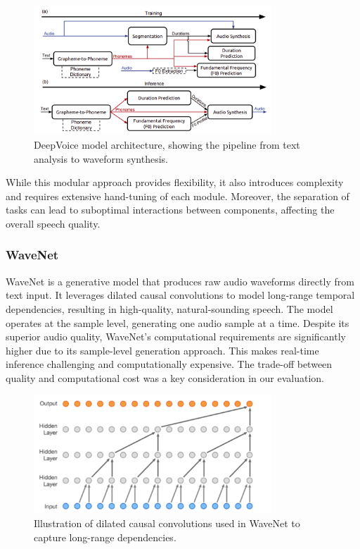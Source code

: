 \begin{figure}[h]
\centering
\includegraphics[width=0.8\textwidth]{deepvoice.png}
\caption{DeepVoice model architecture, showing the pipeline from text analysis to waveform synthesis.}
\label{fig:deepvoice_model}
\end{figure}

While this modular approach provides flexibility, it also introduces complexity and requires extensive hand-tuning of each module. Moreover, the separation of tasks can lead to suboptimal interactions between components, affecting the overall speech quality.



\subsubsection{WaveNet}

WaveNet is a generative model that produces raw audio waveforms directly from text input. It leverages dilated causal convolutions to model long-range temporal dependencies, resulting in high-quality, natural-sounding speech. The model operates at the sample level, generating one audio sample at a time. Despite its superior audio quality, WaveNet's computational requirements are significantly higher due to its sample-level generation approach. This makes real-time inference challenging and computationally expensive. The trade-off between quality and computational cost was a key consideration in our evaluation.


\begin{figure}[h]
\centering
\includegraphics[width=0.8\textwidth]{dilated convolution.png}
\caption{Illustration of dilated causal convolutions used in WaveNet to capture long-range dependencies.}
\label{fig:dilated_convolutions}
\end{figure}

